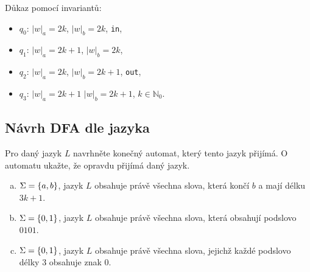 \begin{multicols}{2}


    Důkaz pomocí invariantů:
    \begin{itemize}[noitemsep]
        \item $q_0$: $|w|_a = 2k$, $|w|_b = 2k$, \texttt{in},
        \item $q_1$: $|w|_a = 2k + 1$, $|w|_b = 2k$,
        \item $q_2$: $|w|_a = 2k$, $|w|_b = 2k + 1$, \texttt{out},
        \item $q_3$: $|w|_a = 2k + 1$ $|w|_b = 2k+ 1$, $k \in \mathbb{N}_0$.
    \end{itemize}
\end{multicols}

\subsection{Návrh DFA dle jazyka}
Pro daný jazyk $L$ navrhněte konečný automat, který tento jazyk přijímá. O automatu ukažte, že opravdu přijímá daný 
jazyk.

\begin{enumerate}[a), noitemsep]
    \item $\Sigma = \left\lbrace a,b \right\rbrace$, jazyk $L$ obsahuje právě všechna slova, která končí $b$ a mají délku $3k+1$.
    \item $\Sigma = \left\lbrace 0,1 \right\rbrace$, jazyk $L$ obsahuje právě všechna slova, která obsahují podslovo $0101$.
    \item $\Sigma = \left\lbrace 0,1 \right\rbrace$, jazyk $L$ obsahuje právě všechna slova, jejichž každé podslovo délky $3$ obsahuje znak 
    $0$.
\end{enumerate}

